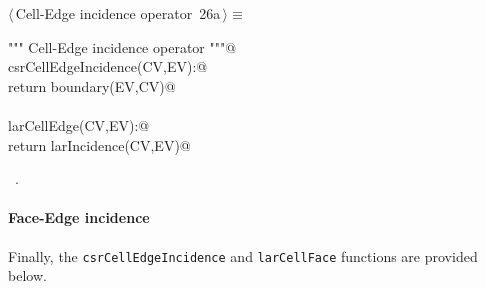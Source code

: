 \documentclass[11pt,oneside]{article}    %
\begin{document}
\begin{flushleft} \small \label{scrap41}
\protect{}$\langle\,$Cell-Edge incidence operator\nobreak\ {\footnotesize 26a}$\,\rangle\equiv$
\vspace{-1ex}
\begin{list}{}{} \item
\mbox{}\verb@""" Cell-Edge incidence operator """@\\
\mbox{}\verb@def csrCellEdgeIncidence(CV,EV):@\\
\mbox{}\verb@     return boundary(EV,CV)@\\
\mbox{}\verb@@\\
\mbox{}\verb@def larCellEdge(CV,EV):@\\
\mbox{}\verb@    return larIncidence(CV,EV)@\\
\mbox{}\verb@@{\NWsep}
\end{list}
\vspace{-1ex}
\footnotesize\addtolength{\baselineskip}{-1ex}
\begin{list}{}{\setlength{\itemsep}{-\parsep}\setlength{\itemindent}{-\leftmargin}}
\item \NWtxtMacroRefIn\ .
\end{list}
\end{flushleft}

\paragraph{Face-Edge incidence}
Finally, the \texttt{csrCellEdgeIncidence} and \texttt{larCellFace} functions are provided below.
\end{document}
